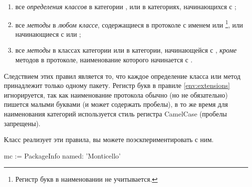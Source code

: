 \documentclass[a4paper,10pt,twoside]{book}
\begin{document}
\begin{enumerate}		
	\item{} все \emph{определения классов} в категории , или в категориях, начинающихся с ;
	\item{} \label{env:extensions} все \emph{методы} в \emph{любом классе}, содержащиеся в протоколе с именем  или \footnote{Регистр букв в наименовании не учитывается.}, или начинающиеся с  или ;
	\item{} все \emph{методы} в классах категории  или в категории, начинающейся с , \emph{кроме} методов в протоколе, наименование которого начинается с \prot{*}.
\end{enumerate}

\noindent

Следствием этих правил является то, что каждое определение класса или метод принадлежит только одному пакету. Регистр букв в правиле \ref{env:extensions} игнорируется, так как наименование протокола обычно (но не обязательно) пишется малыми буквами (и может содержать пробелы), в то же время для наименования категорий используется стиль регистра CamelCase (пробелы запрещены).

Класс  реализует эти правила, вы можете поэскпериментировать с ним.


\begin{code}{}
mc := PackageInfo named: 'Monticello'
\end{code}

\end{document}
